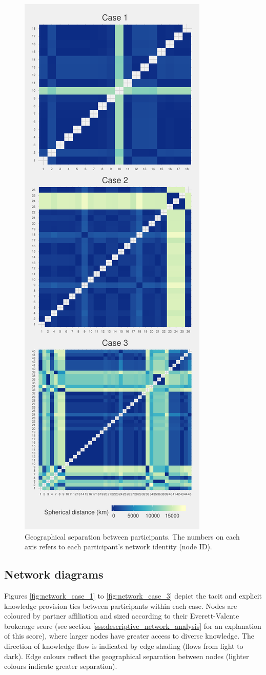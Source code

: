 \begin{figure}[hbt!]
\centering
\includegraphics[width = 0.5\linewidth]{Images/proximity.pdf}
\caption[Geographical separation between participants]{Geographical separation between participants. The numbers on each axis refers to each participant's network identity (node ID).}
\label{fig:spherical}
\end{figure}

\subsection{Network diagrams}

Figures \ref{fig:network_case_1} to \ref{fig:network_case_3} depict the tacit and explicit knowledge provision ties between participants within each case. Nodes are coloured by partner affiliation and sized according to their Everett-Valente brokerage score (see section \ref{sss:descriptive_network_analysis} for an explanation of this score), where larger nodes have greater access to diverse knowledge. The direction of knowledge flow is indicated by edge shading (flows from light to dark). Edge colours reflect the geographical separation between nodes (lighter colours indicate greater separation). \medskip


